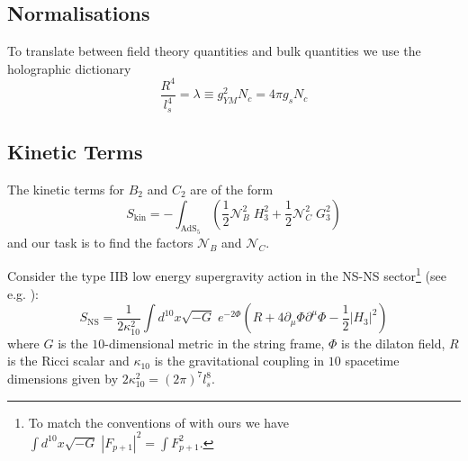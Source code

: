 \documentclass[aps,preprint,nofootinbib,preprintnumbers,eqsecnum,superscriptaddress]{revtex4}
\begin{document}
\begin{appendix}

\section{Normalisations}
To translate between field theory quantities and bulk quantities we use the holographic dictionary \cite{Polchinski:2010hw}
\begin{equation}
\frac{R^4}{l_s^4} = \lambda \equiv g_{YM}^2 N_c = 4\pi g_s N_c
\end{equation}
\subsection{Kinetic Terms}
The kinetic terms for $B_2$ and $C_2$ are of the form
\begin{equation}
S_{\text{kin}} = -\int_{\text{AdS}_5}{\left(\frac{1}{2}\mathcal{N}_B^2 \; H_3^2 + \frac{1}{2}\mathcal{N}_C^2 \; G_3^2 \right)}
\end{equation}
and our task is to find the factors $\mathcal{N}_B$ and $\mathcal{N}_C$.

Consider the type IIB low energy supergravity action in the NS-NS sector\footnote{To match the conventions of \cite{Polchinski:1998rr} with ours we have $\int{d^{10}x \sqrt{-G} \; |F_{p+1}|^2} =	\int{F_{p+1}^2}$.} (see e.g. \cite{Polchinski:1998rr}):
\begin{equation}
	S_{\text{NS}} = \frac{1}{2 \kappa_{10}^2} \int{d^{10}x \sqrt{-G} \; e^{-2 \Phi} \left(R + 4 \partial_\mu \Phi \partial^\mu \Phi - \frac{1}{2} |H_3|^2 \right)}
\end{equation}
where $G$ is the $10$-dimensional metric in the string frame, $\Phi$ is the dilaton field, $R$ is the Ricci scalar and $\kappa_{10}$ is the gravitational coupling in $10$ spacetime dimensions given by $2\kappa_{10}^2= (2\pi)^7 l_s^8$.%


\end{appendix}
\end{document}
